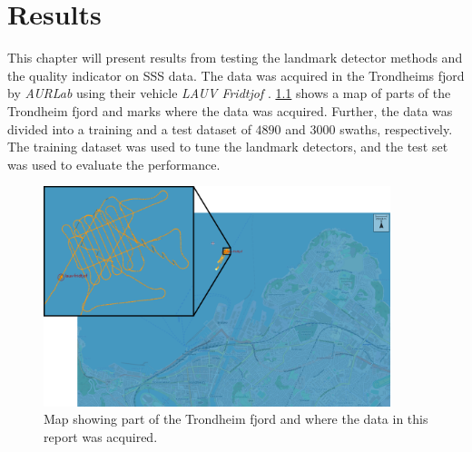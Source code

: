 \chapter{Results}

This chapter will present results from testing the landmark detector methods and the quality indicator on SSS data. The data was acquired in the Trondheims fjord by \textit{AURLab} using their vehicle \textit{LAUV Fridtjof} \cite{LAUVNTNU}. \cref{fig:neptus_screenshot} shows a map of parts of the Trondheim fjord and marks where the data was acquired. Further, the data was divided into a training and a test dataset of $4890$ and $3000$ swaths, respectively. The training dataset was used to tune the landmark detectors, and the test set was used to evaluate the performance. 

\begin{figure} [h]%
  \centering
  \includegraphics[width=0.9\textwidth]{figures/hercules_data.png}
  \caption{Map showing part of the Trondheim fjord and where the data in this report was acquired.}
  \label{fig:neptus_screenshot}
\end{figure}

